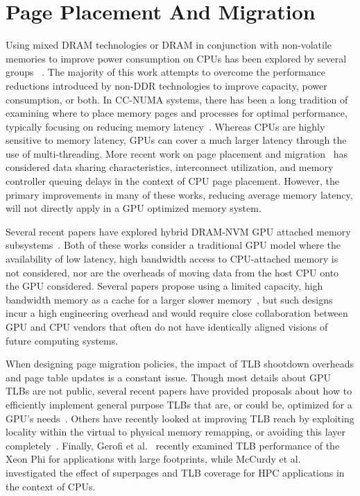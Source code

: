 \section{Page Placement And Migration}
Using mixed DRAM technologies or DRAM in conjunction with non-volatile memories
to improve power consumption on CPUs has been explored by several groups
~\cite{Kultursay2013,Phadke11mlpaware2011,Mogul2009,Bheda2011,Ramos2011}.  The
majority of this work attempts to overcome the performance reductions introduced
by non-DDR technologies to improve capacity, power consumption, or both.  In
CC-NUMA systems, there has been a long tradition of examining where to place
memory pages and processes for optimal performance, typically focusing on
reducing memory
latency~\cite{Wilson2001,Bolosky1989,Brecht1993,LaRowe1992,Verghese1996,Iyer1998}.
Whereas CPUs are highly sensitive to memory latency, GPUs can cover a much
larger latency through the use of multi-threading.  More recent work on page
placement and
migration~\cite{AUTONUMA,Dashti2013,Tam2007,Zhuravlev2010,Knauerhase2008,Blagodurov2011,awasthinellans10}
has considered data sharing characteristics, interconnect utilization, and
memory controller queuing delays in the context of CPU page placement. However,
the primary improvements in many of these works, reducing average memory
latency, will not directly apply in a GPU optimized memory system.

Several recent papers have explored hybrid DRAM-NVM GPU attached memory
subsystems~\cite{zhao2013,Wang2013}.  Both of these works consider a traditional
GPU model where the availability of low latency, high bandwidth access to
CPU-attached memory is not considered, nor are the overheads of moving data from
the host CPU onto the GPU considered.  Several papers propose using a limited
capacity, high bandwidth memory as a cache for a larger slower
memory~\cite{jiang2011,Meza2012}, but such designs incur a high engineering
overhead and would require close collaboration between GPU and CPU vendors that
often do not have identically aligned visions of future computing systems.

When designing page migration policies, the impact of TLB shootdown overheads
and page table updates is a constant issue.  Though most details about GPU TLBs
are not public, several recent papers have provided proposals about how to
efficiently implement general purpose TLBs that are, or could be, optimized for
a GPU's needs~\cite{Pichai2014,Villavieja2011,Power2014}. Others have recently
looked at improving TLB reach by exploiting locality within the virtual to
physical memory remapping, or avoiding this layer
completely~\cite{swansonstoller98,Pham2014,Basu2013}.  Finally, Gerofi et
al.~\cite{Gerofi2014} recently examined TLB performance of the Xeon Phi for
applications with large footprints, while McCurdy et al.~\cite{McCurdy2008}
investigated the effect of superpages and TLB coverage for HPC applications in
the context of CPUs.

